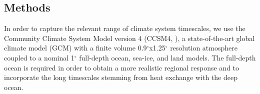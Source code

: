 \documentclass[grl]{AGUTeX}  %
\begin{document}
\begin{article}

%

\section{Methods}

In order to capture the relevant range of climate system timescales, we use the Community Climate System Model version 4 (CCSM4, \cite{gent11}), a state-of-the-art global climate model (GCM) with a finite volume 0.9$^\circ$x1.25$^\circ$ resolution atmosphere coupled to a nominal 1$^\circ$ full-depth ocean, sea-ice, and land models. The full-depth ocean is required in order to obtain a more realistic regional response \citep{mccusker12} and to incorporate the long timescales stemming from heat exchange with the deep ocean. %


\end{article}
\end{document}
